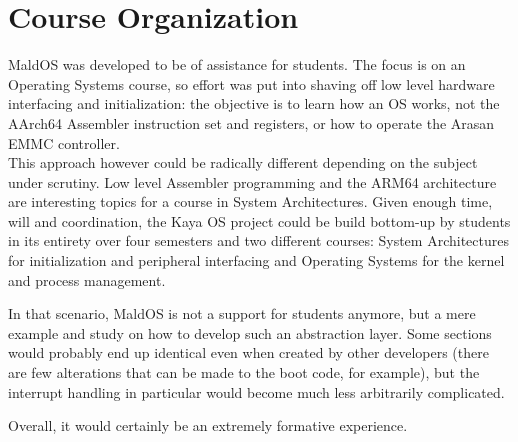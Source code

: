 \documentclass[12pt,a4paper,openright,twoside]{report}
\begin{document}
\section{Course Organization}
MaldOS was developed to be of assistance for students. The focus is on an Operating
Systems course, so effort was put into shaving off low level hardware interfacing
and initialization: the objective is to learn how an OS works, not the AArch64 Assembler
instruction set and registers, or how to operate the Arasan EMMC controller.\\
This approach however could be radically different depending on the subject under 
scrutiny. Low level Assembler programming and the ARM64 architecture are interesting
topics for a course in System Architectures. Given enough time, will and coordination,
the Kaya OS project could be build bottom-up by students in its entirety over four
semesters and two different courses: System Architectures for initialization and
peripheral interfacing and Operating Systems for the kernel and process management.

In that scenario, MaldOS is not a support for students anymore, but a mere example
and study on how to develop such an abstraction layer. Some sections would probably
end up identical even when created by other developers (there are few alterations
that can be made to the boot code, for example), but the interrupt handling in 
particular would become much less arbitrarily complicated. 

Overall, it would certainly be an extremely formative experience.
\end{document}
